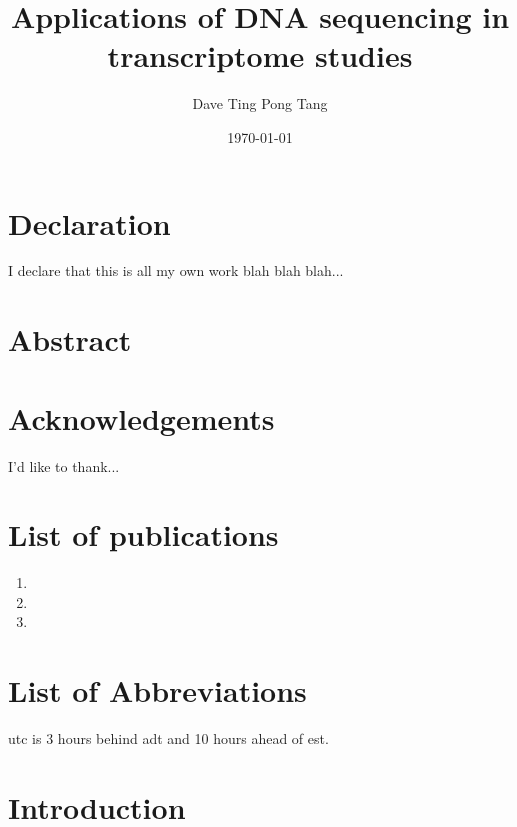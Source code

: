 \documentclass[12pt,a4paper]{report}
\begin{document}
%

\title{
   {Applications of DNA sequencing in transcriptome studies}
}

\author{Dave Ting Pong Tang}
\date{\today}
\maketitle

\chapter*{Declaration}
I declare that this is all my own work blah blah blah...

\chapter*{Abstract}


\chapter*{Acknowledgements}
I'd like to thank...

\chapter*{List of publications}

\begin{enumerate}
\item {}
\item {}
\item {}
\end{enumerate}

\tableofcontents

\listoffigures

\chapter*{List of Abbreviations}

 
\gls{utc} is 3 hours behind \gls{adt} and 10 hours ahead of \gls{est}.
 
\printglossaries

\chapter{Introduction}

\end{document}
